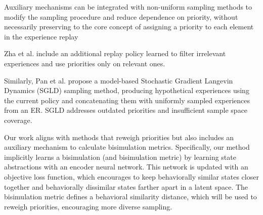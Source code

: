 Auxiliary mechanisms can be integrated with non-uniform sampling methods to modify the sampling procedure and reduce dependence on priority, without necessarily preserving to the core concept of assigning a priority to each element in the experience replay

Zha et al. \cite{zha2019experience} include an additional replay policy learned to filter irrelevant experiences and use priorities only on relevant ones.

Similarly, Pan et al. \cite{pan2022understanding} propose a model-based Stochastic Gradient Langevin Dynamics (SGLD) sampling method, producing hypothetical experiences using the current policy and concatenating them with uniformly sampled experiences from an ER. SGLD addresses outdated priorities and insufficient sample space coverage.


Our work aligns with methods that reweigh priorities but also includes an auxiliary mechanism to calculate bisimulation metrics. Specifically, our method implicitly learns a bisimulation (and bisimulation metric) by learning state abstractions with an encoder neural network. This network is updated with an objective loss function, which encourages to keep behaviorally similar states closer together and behaviorally dissimilar states farther apart in a latent space. The bisimulation metric defines a behavioral similarity distance, which will be used to reweigh priorities, encouraging more diverse sampling.



